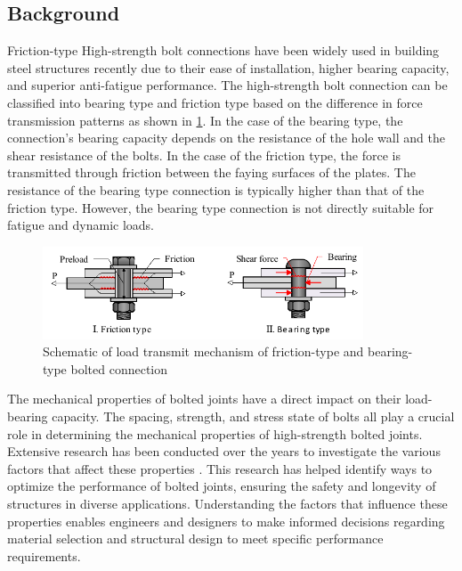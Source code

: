 \subsection{Background}

Friction-type High-strength bolt connections have been widely used in building steel structures recently due to their ease of installation, higher bearing capacity, and superior anti-fatigue performance. The high-strength bolt connection can be classified into bearing type and friction type based on the difference in force transmission patterns as shown in \ref{fig-fricandbearing}. In the case of the bearing type, the connection's bearing capacity depends on the resistance of the hole wall and the shear resistance of the bolts. In the case of the friction type, the force is transmitted through friction between the faying surfaces of the plates. The resistance of the bearing type connection is typically higher than that of the friction type. However, the bearing type connection is not directly suitable for fatigue and dynamic loads.

\begin{figure}
    \centering
    \includegraphics[width=0.85\textwidth]{imgs/ch2/fricandbearing.pdf}
    \caption{Schematic of load transmit mechanism of friction-type and bearing-type bolted connection}
    \label{fig-fricandbearing}
\end{figure}

The mechanical properties of bolted joints have a direct impact on their load-bearing capacity. The spacing, strength, and stress state of bolts all play a crucial role in determining the mechanical properties of high-strength bolted joints. Extensive research has been conducted over the years to investigate the various factors that affect these properties \cite{peng2015,Lyu2019NumericalSteels,Brian1996EdgeOcnnections,wang2020interface,hirashima2004experimental}. This research has helped identify ways to optimize the performance of bolted joints, ensuring the safety and longevity of structures in diverse applications. Understanding the factors that influence these properties enables engineers and designers to make informed decisions regarding material selection and structural design to meet specific performance requirements.

